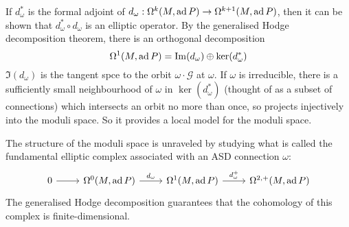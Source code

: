If $d^*_\omega$ is the formal adjoint of $d_\omega : \Omega^k(M,\operatorname{ad} P) \to
\Omega^{k+1}(M,\operatorname{ad} P)$, then it can be shown that $d^*_\omega \circ d_\omega$ is
an elliptic operator. By the generalised Hodge decomposition theorem,
there is an orthogonal decomposition 
 \[
\Omega^1(M,\operatorname{ad} P) = {\operatorname{Im}}(d_\omega) \oplus \ker(d^*_\omega)
\] 
$\Im(d_\omega)$ is the tangent spce to the orbit  $\omega \cdot \mathcal{G}$ at
$\omega$. 
If $\omega$ is irreducible, there is a sufficiently small neighbourhood of 
$\omega$ in  $\ker(d^*_\omega)$ (thought of as a subset of connections)
which intersects an orbit no more than once, so projects injectively into the
moduli space. So it provides a local model for the moduli space.

The structure of the moduli space is unraveled by studying what is called the
fundamental elliptic complex associated with an ASD connection $\omega$:
\[
\begin{tikzcd}
	0 \arrow[r] &\Omega^0(M,\ad P) \arrow[r,"d_\omega"] 
				&\Omega^1(M,\ad P) \arrow[r,"d^+_\omega"] &\Omega^{2,+}(M,\ad P)
\end{tikzcd} 
\]
The generalised Hodge decomposition guarantees that the cohomology of this
complex is finite-dimensional. 

